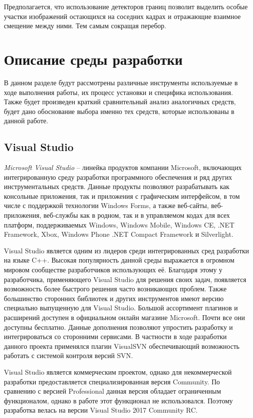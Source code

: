 Предполагается, что использование детекторов границ позволит выделить особые участки изображений остающихся на соседних кадрах и отражающие взаимное смещение между ними. Тем самым сокращая перебор.  

\section{Описание среды разработки}
\label{sec:env_description}
В данном разделе будут рассмотрены различные инструменты используемые в ходе выполнения работы, их процесс установки и специфика использования. Также будет произведен краткий сравнительный анализ аналогичных средств, будет дано обоснование выбора именно тех средств, которые использованы в данной работе. 
\subsection{Visual Studio}
\label{sub:env_description:vs}
\textit{Microsoft Visual Studio} -- линейка продуктов компании Microsoft, включающих интегрированную среду разработки программного обеспечения и ряд других инструментальных средств. Данные продукты позволяют разрабатывать как консольные приложения, так и приложения с графическим интерфейсом, в том числе с поддержкой технологии Windows Forms, а также веб-сайты, веб-приложения, веб-службы как в родном, так и в управляемом кодах для всех платформ, поддерживаемых Windows, Windows Mobile, Windows CE, .NET Framework, Xbox, Windows Phone .NET Compact Framework и Silverlight.

Visual Studio является одним из лидеров среди интегрированных сред разработки на языке C++. Высокая популярность данной среды выражается в огромном мировом сообществе разработчиков использующих её. Благодаря этому у разработчика, применяющего Visual Studio для решения своих задач, появляется возможность более быстрого решения часто возникающих проблем. Также большинство сторонних библиотек и других инструментов имеют версию специально выпущенную для Visual Studio. Большой ассортимент плагинов и расширений доступен в официальном онлайн магазине Microsoft. Почти все они доступны бесплатно. Данные дополнения позволяют упростить разработку и интегрироваться со сторонними сервисами. В частности в ходе разработки данного проекта применялся плагин VisualSVN обеспечивающий возможность работать с системой контроля версий SVN.

Visual Studio является коммерческим проектом, однако для некоммерческой разработки предоставляется специализированная версия Community. По сравнению с версией Professional данная версия обладает ограниченным функционалом, однако в работе этот функционал не использовался. Поэтому разработка велась на версии Visual Studio 2017 Community RC.

